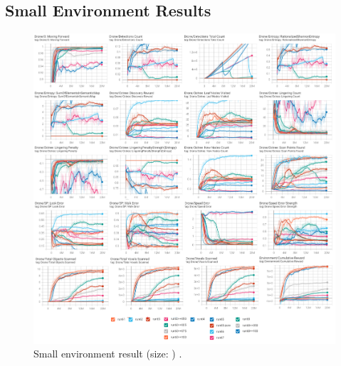 \subsection{Small Environment Results}
\begin{figure}[!ht]
        \centering
        \includegraphics[width=1\textwidth]{images/results_baseAgent.png}
        \caption{Small environment result (size: ) .
        }
        \label{fig:results-small-env-performances}
\end{figure}

